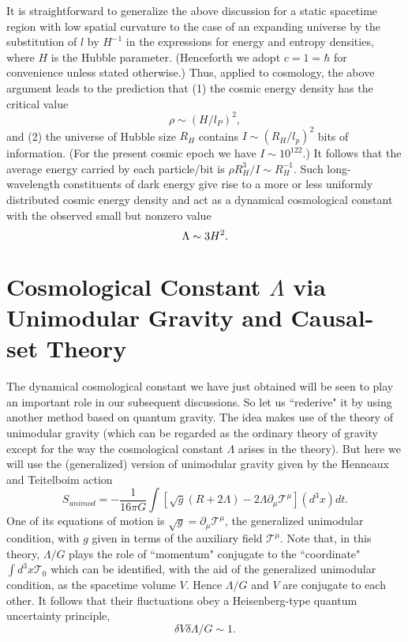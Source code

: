 \documentclass[a4paper]{jpconf}
\begin{document}
It is straightforward to generalize \cite{Arzano} the above discussion for a 
static spacetime region with low spatial curvature to the
case of an expanding
universe by the substitution of $l$ by $H^{-1}$ in the expressions for
energy and entropy densities, where $H$ is the Hubble parameter. (Henceforth we 
adopt $c=1=\hbar$ for convenience unless stated otherwise.)  Thus,
applied to cosmology, the above argument leads to the prediction
that (1) the cosmic energy density has the critical value 
\begin{equation}
\rho \sim (H/l_P)^2, 
\end{equation}
and (2) the universe
of Hubble size $R_H$ contains $I \sim (R_H/l_p)^2$ bits of 
information. (For the present cosmic epoch we have $I \sim 10^{122}$.)
It follows that the average energy carried by each particle/bit is
$\rho R_H^3/I \sim R_H^{-1}$.
Such long-wavelength constituents of dark energy give rise to
a more or less uniformly distributed cosmic energy density and
act as a dynamical cosmological constant with the observed small but nonzero 
value
\begin{equation}
\Lambda \sim 3 H^2.\\
\label{cc}
\end{equation}
%

\section{\bf Cosmological Constant $\Lambda$ via
Unimodular Gravity and Causal-set Theory}
The dynamical cosmological constant we have just obtained will be seen
to play an important role in our subsequent discussions.  So let us 
``rederive" it by using another method based on quantum gravity.
The idea makes use of the theory of
unimodular gravity\cite{Bij,PRL} (which
can be regarded as the ordinary theory of gravity except for the
way the cosmological constant $\Lambda$ arises in the theory).  But here
we will use the (generalized) version of unimodular gravity given by the
Henneaux and Teitelboim action\cite{ht}
\begin{equation}
S_{unimod} = - \frac{1}{16 \pi G} \int [ \sqrt{g} (R + 2 \Lambda) - 2
\Lambda
\partial_\mu {\mathcal T}^\mu](d^3x)dt.
\label{HT}
\end{equation}
One of its equations of motion is $\sqrt{g} = \partial_\mu
\mathcal{T}^\mu$,
the generalized unimodular condition, with $g$ given in terms of the
auxiliary field $\mathcal{T}^{\mu}$.  Note that, in this theory,
$\Lambda / G$ plays the role of
``momentum" conjugate to the ``coordinate" $\int d^3x {\mathcal T}_0$ which
can
be identified, with the aid of the generalized unimodular condition, as
the spacetime volume $V$.  Hence $\Lambda /G$ and $V$ are
conjugate to each other.  It follows that
their fluctuations obey a Heisenberg-type
quantum uncertainty principle,
\begin{equation}
\delta V \! \delta \Lambda/G \sim 1.
\label{heisenb}
\end{equation}
\end{document}
